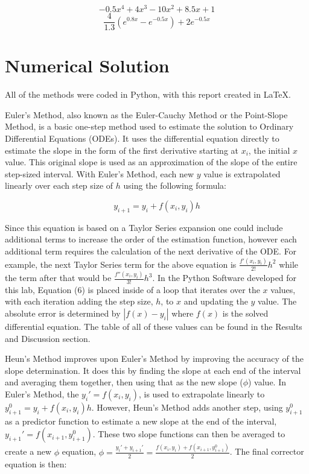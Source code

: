 \documentclass[12pt, letterpaper]{article}
\begin{document}
		\begin{equation*}-0.5x^4+4x^3-10x^2+8.5x+1\end{equation*}
		\begin{equation*}\frac{4}{1.3}\left(e^{0.8x}-e^{-0.5x}\right)+2e^{-0.5x}\end{equation*}

	 
\section{\label{solution}Numerical Solution}
	All of the methods were coded in Python, with this report created in \LaTeX{}.
	
	Euler's Method, also known as the Euler-Cauchy Method or the Point-Slope Method, is a basic one-step method used to estimate the solution to Ordinary Differential Equations (ODEs). It uses the differential equation directly to estimate the slope in the form of the first derivative starting at $x_i$, the initial $x$ value. This original slope is used as an approximation of the slope of the entire step-sized interval. With Euler's Method, each new $y$ value is extrapolated linearly over each step size of $h$ using the following formula:
	
	\begin{equation}y_{i+1}=y_i+f(x_i, y_i)h\end{equation}
	
	Since this equation is based on a Taylor Series expansion one could include additional terms to increase the order of the estimation function, however each additional term requires the calculation of the next derivative of the ODE. For example, the next Taylor Series term for the above equation is $\frac{f'(x_i,y_i)}{2!}h^2$ while the term after that would be $\frac{f''(x_i,y_i)}{3!}h^3$. In the Python Software developed for this lab, Equation (6) is placed inside of a loop that iterates over the $x$ values, with each iteration adding the step size, $h$, to $x$ and updating the $y$ value. The absolute error is determined by $\left|f(x)-y_i\right|$ where $f(x)$ is the solved differential equation. The table of all of these values can be found in the Results and Discussion section. 
	
	Heun's Method improves upon Euler's Method by improving the accuracy of the slope determination. It does this by finding the slope at each end of the interval and averaging them together, then using that as the new slope ($\phi$) value. In Euler's Method, the $y_i'=f(x_i,y_i)$, is used to extrapolate linearly to $y_{i+1}^0=y_i+f(x_i, y_i)h$. However, Heun's Method adds another step, using $y_{i+1}^0$ as a predictor function to estimate a new slope at the end of the interval, $y_{i+1}'=f(x_{i+1},y_{i+1}^0)$. These two slope functions can then be averaged to create a new $\phi$ equation, $\phi=\frac{y_i'+y_{i+1}'}{2}=\frac{f(x_i, y_i)+f(x_{i+1},y_{i+1}^0)}{2}$. The final corrector equation is then:
	
\end{document}
